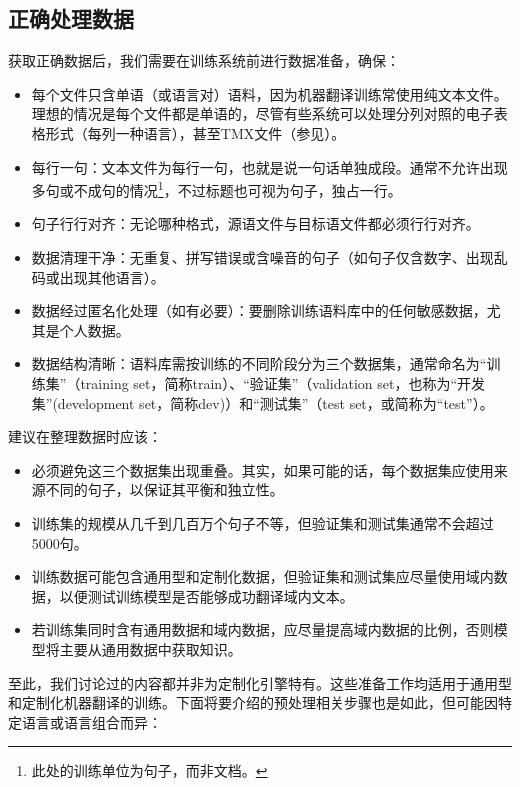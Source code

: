 \documentclass[output=paper]{langscibook}
\begin{document}
\subsection{正确处理数据}
获取正确数据后，我们需要在训练系统前进行数据准备，确保：
\begin{itemize}
\item  每个文件只含单语（或语言对）语料，因为机器翻译训练常使用纯文本文件。理想的情况是每个文件都是单语的，尽管有些系统可以处理分列对照的电子表格形式（每列一种语言），甚至TMX文件（参见）。

\item 每行一句：文本文件为每行一句，也就是说一句话单独成段。通常不允许出现多句或不成句的情况\footnote{此处的训练单位为句子，而非文档。}，不过标题也可视为句子，独占一行。

\item 句子行行对齐：无论哪种格式，源语文件与目标语文件都必须行行对齐。

\item 数据清理干净：无重复、拼写错误或含噪音的句子（如句子仅含数字、出现乱码或出现其他语言）。

\item 数据经过匿名化处理（如有必要）：要删除训练语料库中的任何敏感数据，尤其是个人数据。

\item 数据结构清晰：语料库需按训练的不同阶段分为三个数据集，通常命名为“训练集”（training set，简称train）、“验证集”（validation set，也称为“开发集”(development set，简称dev)）和“测试集”（test set，或简称为“test”）。
\end{itemize}

建议在整理数据时应该：
\begin{itemize}
\item 必须避免这三个数据集出现重叠。其实，如果可能的话，每个数据集应使用来源不同的句子，以保证其平衡和独立性。
\item 训练集的规模从几千到几百万个句子不等，但验证集和测试集通常不会超过5000句。
\item 训练数据可能包含通用型和定制化数据，但验证集和测试集应尽量使用域内数据，以便测试训练模型是否能够成功翻译域内文本。
\item 若训练集同时含有通用数据和域内数据，应尽量提高域内数据的比例，否则模型将主要从通用数据中获取知识。
\end{itemize}

至此，我们讨论过的内容都并非为定制化引擎特有。这些准备工作均适用于通用型和定制化机器翻译的训练。下面将要介绍的预处理相关步骤也是如此，但可能因特定语言或语言组合而异：
\end{document}
